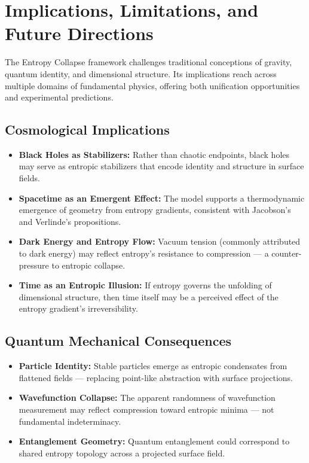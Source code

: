 \documentclass[12pt]{article}
\begin{document}
\clearpage
\section{Implications, Limitations, and Future Directions}

The Entropy Collapse framework challenges traditional conceptions of gravity, quantum identity, and dimensional structure. Its implications reach across multiple domains of fundamental physics, offering both unification opportunities and experimental predictions.

\clearpage
\subsection*{Cosmological Implications}

\begin{itemize}[leftmargin=1.5em]
  \item \textbf{Black Holes as Stabilizers:} Rather than chaotic endpoints, black holes may serve as entropic stabilizers that encode identity and structure in surface fields.
  
  \item \textbf{Spacetime as an Emergent Effect:} The model supports a thermodynamic emergence of geometry from entropy gradients, consistent with Jacobson's and Verlinde’s propositions.
  
  \item \textbf{Dark Energy and Entropy Flow:} Vacuum tension (commonly attributed to dark energy) may reflect entropy’s resistance to compression — a counter-pressure to entropic collapse.
  
  \item \textbf{Time as an Entropic Illusion:} If entropy governs the unfolding of dimensional structure, then time itself may be a perceived effect of the entropy gradient’s irreversibility.
\end{itemize}

\clearpage
\subsection*{Quantum Mechanical Consequences}

\begin{itemize}[leftmargin=1.5em]
  \item \textbf{Particle Identity:} Stable particles emerge as entropic condensates from flattened fields — replacing point-like abstraction with surface projections.
  
  \item \textbf{Wavefunction Collapse:} The apparent randomness of wavefunction measurement may reflect compression toward entropic minima — not fundamental indeterminacy.
  
  \item \textbf{Entanglement Geometry:} Quantum entanglement could correspond to shared entropy topology across a projected surface field.
\end{itemize}
\FloatBarrier
\end{document}
